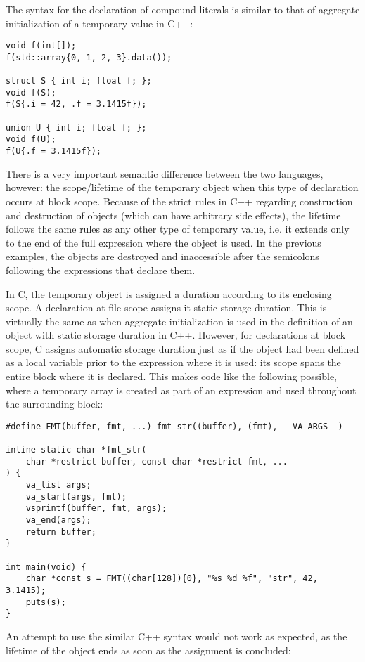 The syntax for the declaration of compound literals is similar to that of
aggregate initialization of a temporary value in C++:

\begin{lstlisting}[style=c++]
void f(int[]);
f(std::array{0, 1, 2, 3}.data());

struct S { int i; float f; };
void f(S);
f(S{.i = 42, .f = 3.1415f});

union U { int i; float f; };
void f(U);
f(U{.f = 3.1415f});
\end{lstlisting}

There is a very important semantic difference between the two languages,
however: the scope/lifetime of the temporary object when this type of
declaration occurs at block scope.  Because of the strict rules in C++ regarding
construction and destruction of objects (which can have arbitrary side effects),
the lifetime follows the same rules as any other type of temporary value, i.e.
it extends only to the end of the full expression where the object is used.  In
the previous examples, the objects are destroyed and inaccessible after the
semicolons following the expressions that declare them.

In C, the temporary object is assigned a duration according to its enclosing
scope.  A declaration at file scope assigns it static storage duration.  This is
virtually the same as when aggregate initialization is used in the definition of
an object with static storage duration in C++.  However, for declarations at
block scope, C assigns automatic storage duration just as if the object had been
defined as a local variable prior to the expression where it is used: its scope
spans the entire block where it is declared.  This makes code like the following
possible, where a temporary array is created as part of an expression and used
throughout the surrounding block:

\begin{lstlisting}[style=c]
#define FMT(buffer, fmt, ...) fmt_str((buffer), (fmt), __VA_ARGS__)

inline static char *fmt_str(
    char *restrict buffer, const char *restrict fmt, ...
) {
    va_list args;
    va_start(args, fmt);
    vsprintf(buffer, fmt, args);
    va_end(args);
    return buffer;
}

int main(void) {
    char *const s = FMT((char[128]){0}, "%s %d %f", "str", 42, 3.1415);
    puts(s);
}
\end{lstlisting}

An attempt to use the similar C++ syntax would not work as expected, as the
lifetime of the object ends as soon as the assignment is concluded:

